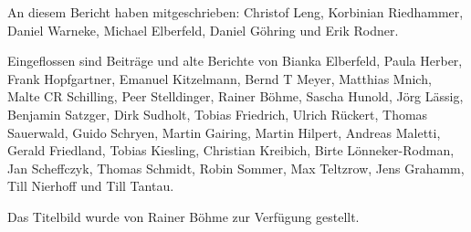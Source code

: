 \documentclass[a4paper]{scrreprt}
\begin{document}
\vfill

An diesem Bericht haben mitgeschrieben: Christof Leng, Korbinian
Riedhammer, Daniel Warneke, Michael Elberfeld, Daniel Göhring und
Erik Rodner. 

Eingeflossen sind Beiträge und alte Berichte von Bianka Elberfeld,
Paula Herber, Frank Hopfgartner, Emanuel Kitzelmann, Bernd T Meyer,
Matthias Mnich, Malte CR Schilling, Peer Stelldinger, Rainer Böhme,
Sascha Hunold, Jörg Lässig, Benjamin Satzger, Dirk Sudholt, Tobias
Friedrich, Ulrich Rückert, Thomas Sauerwald, Guido Schryen, Martin
Gairing, Martin Hilpert, Andreas Maletti, Gerald Friedland, Tobias
Kiesling, Christian Kreibich, Birte Lönneker-Rodman, Jan Scheffczyk,
Thomas Schmidt, Robin Sommer, Max Teltzrow, Jens Grahamm, Till
Nierhoff und Till Tantau.

Das Titelbild wurde von Rainer Böhme zur Verfügung gestellt.
\end{document}
